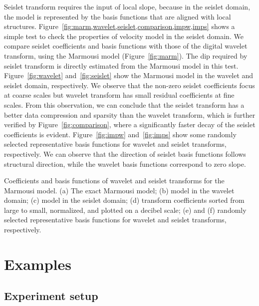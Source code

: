 Seislet transform requires the input of local slope, because in the seislet domain, the model is represented by the basis functions that are aligned with local structures.
Figure~\ref{fig:marm,wavelet,seislet,comparison,impw,imps} shows a simple test to check the properties of velocity model in the seislet domain.
We compare seislet coefficients and basis functions with those of the digital wavelet transform, using the Marmousi model (Figure~\ref{fig:marm}). 
The dip required by seislet transform is directly estimated from the Marmousi model in this test.
Figure~\ref{fig:wavelet} and~\ref{fig:seislet} show the Marmousi model in the wavelet and seislet domain, respectively.
We observe that the non-zero seislet coefficients focus at coarse scales but wavelet transform has small residual coefficients at fine scales.
From this observation, we can conclude that the seislet transform has a better data compression and sparsity than the wavelet transform, 
which is further verified by Figure~\ref{fig:comparison},
where a significantly faster decay of the seislet coefficients is evident.
Figure~\ref{fig:impw} and~\ref{fig:imps} show some randomly selected representative basis functions for wavelet and seislet transforms, respectively.
We can observe that the direction of seislet basis functions follows structural direction,
while the wavelet basis functions correspond to zero slope.

{Coefficients and basis functions of wavelet and seislet transforms for the Marmousi model. 
(a) The exact Marmousi model; (b) model in the wavelet domain; (c) model in the seislet domain;
(d) transform coefficients sorted from large to small, normalized, and plotted on a decibel scale;
(e) and (f) randomly selected representative basis functions for wavelet and seislet transforms, respectively.}

\section{Examples}
\subsection{Experiment setup}

